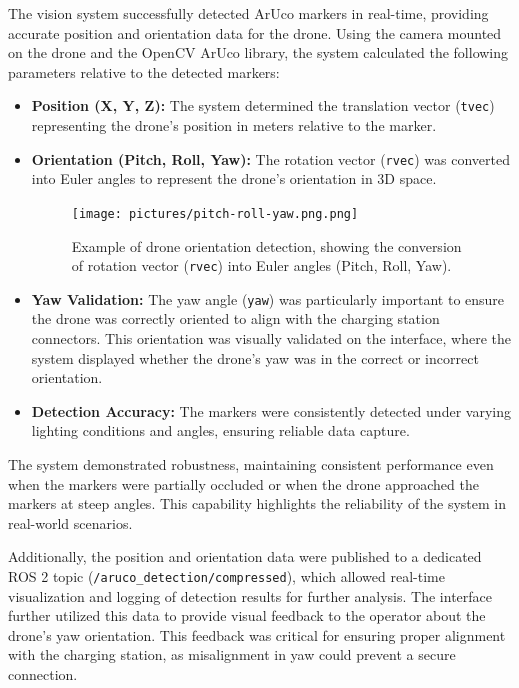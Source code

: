 The vision system successfully detected ArUco markers in real-time, providing accurate position and orientation data for the drone. Using the camera mounted on the drone and the OpenCV ArUco library, the system calculated the following parameters relative to the detected markers:
\begin{itemize}
    \item \textbf{Position (X, Y, Z):} The system determined the translation vector (\texttt{tvec}) representing the drone's position in meters relative to the marker.
    
    \item \textbf{Orientation (Pitch, Roll, Yaw):} The rotation vector (\texttt{rvec}) was converted into Euler angles to represent the drone's orientation in 3D space.
    
    \begin{figure}[H]
        \centering
        \texttt{[image: pictures/pitch-roll-yaw.png.png]}
        \caption{Example of drone orientation detection, showing the conversion of rotation vector (\texttt{rvec}) into Euler angles (Pitch, Roll, Yaw).}
        \label{fig:drone_orientation}
    \end{figure}

    \item \textbf{Yaw Validation:} The yaw angle (\texttt{yaw}) was particularly important to ensure the drone was correctly oriented to align with the charging station connectors. This orientation was visually validated on the interface, where the system displayed whether the drone's yaw was in the correct or incorrect orientation.
    \item \textbf{Detection Accuracy:} The markers were consistently detected under varying lighting conditions and angles, ensuring reliable data capture.
\end{itemize}

The system demonstrated robustness, maintaining consistent performance even when the markers were partially occluded or when the drone approached the markers at steep angles. This capability highlights the reliability of the system in real-world scenarios.

Additionally, the position and orientation data were published to a dedicated ROS 2 topic (\texttt{/aruco\_detection/compressed}), which allowed real-time visualization and logging of detection results for further analysis. The interface further utilized this data to provide visual feedback to the operator about the drone's yaw orientation. This feedback was critical for ensuring proper alignment with the charging station, as misalignment in yaw could prevent a secure connection.

